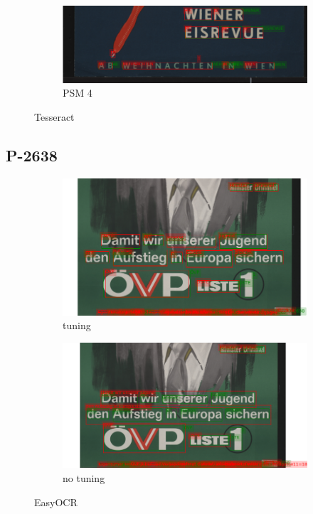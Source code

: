 \begin{figure}[hbtp!]
    \begin{subfigure}{\textwidth}
        \centering
        \includegraphics[scale=0.36]{obrazky/plakaty/result_tesseract_vienna1_split_psm4-21.png}
        \caption{PSM 4}
        \label{Im2:ex:tess4}
    \end{subfigure}
    \caption{Tesseract}
    \label{Im2:ex:tess}
\end{figure}


\subsection*{P-2638}

\begin{figure}[hbtp!]
    \begin{subfigure}{\textwidth}
        \centering
        \includegraphics[scale=0.36]{obrazky/plakaty/result_easyOCR_vienna1_split_tuning-91.png}
        \caption{tuning}
        \label{Im1:ex:easytun}
    \end{subfigure}

    \begin{subfigure}{\textwidth}
        \centering
        \includegraphics[scale=0.36]{obrazky/plakaty/result_easyOCR_vienna1_nosplit_notuning-91.png}
        \caption{no tuning}
        \label{Im1:ex:easy}
    \end{subfigure}
    \caption{EasyOCR}
    \label{Im1:ex:EasyOCR}
\end{figure}

